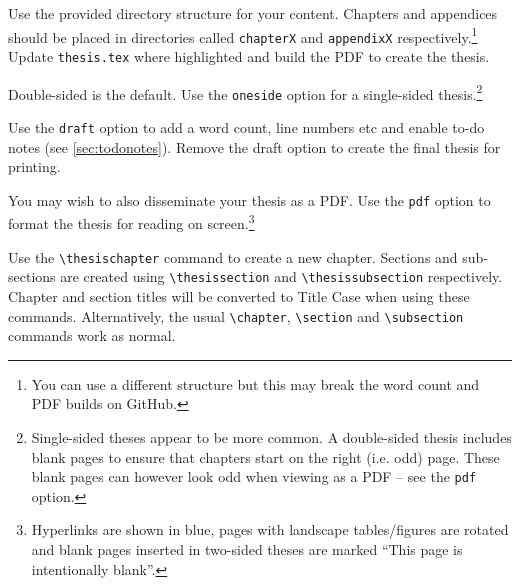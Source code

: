 
Use the provided directory structure for your content. Chapters and appendices should be
placed in directories called \texttt{chapterX} and \texttt{appendixX} respectively.\footnote{You
can use a different structure but this may break the word count and PDF builds on GitHub.}
Update \texttt{thesis.tex} where highlighted and build the PDF to create the thesis.


\begin{description}[leftmargin=!,labelwidth=\widthof{\tt oneside}]
  \item[\texttt{oneside}] Double-sided is the default. Use the \texttt{oneside} option for
  a single-sided thesis.\footnote{Single-sided theses appear to be more common. A double-sided
  thesis includes blank pages to ensure that chapters start on the right (i.e. odd) page.
  These blank pages can however look odd when viewing as a PDF -- see the \texttt{pdf} option.}
  \item[\texttt{draft}] Use the \texttt{draft} option to add a word count, line numbers etc
  and enable to-do notes (see \cref{sec:todonotes}). Remove the draft option to create the
  final thesis for printing.
  \item[\texttt{pdf}] You may wish to also disseminate your thesis as a PDF. Use the \texttt{pdf}
  option to format the thesis for reading on screen.\footnote{Hyperlinks are shown in blue,
  pages with landscape tables/figures are rotated and blank pages inserted in two-sided
  theses are marked ``This page is intentionally blank''.}
  \end{description}



Use the \verb|\thesischapter| command to create a new chapter. Sections and sub-sections
are created using \verb|\thesissection| and \verb|\thesissubsection| respectively.
Chapter and section titles will be converted to Title Case when using these commands.
Alternatively, the usual \verb|\chapter|, \verb|\section| and \verb|\subsection| commands
work as normal.

